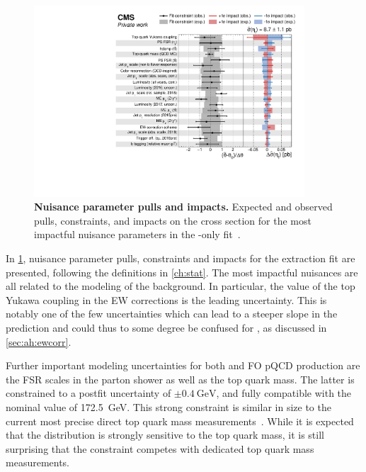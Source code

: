 \begin{figure}[th]
    \centering
    \includegraphics[width=0.9\textwidth]{figures/ah/etatfit/impacts_nonps.pdf}
    \caption{
        \textbf{Nuisance parameter pulls and impacts.} Expected and observed pulls, constraints, and impacts on the \etat cross section for the most impactful nuisance parameters in the \etat-only fit~\cite{CMS:TOP-24-007}.
    }
    \label{fig:ah:impacts_etat}
\end{figure}

In \cref{fig:ah:impacts_etat}, nuisance parameter pulls, constraints and impacts for the \etat extraction fit are presented, following the definitions in \cref{ch:stat}. The most impactful nuisances are all related to the modeling of the \ttbar background. In particular, %
the value of the top Yukawa coupling \yt in the EW corrections is the leading uncertainty. This is notably one of the few uncertainties which can lead to a steeper \chel slope in the \ttbar prediction and could thus to some degree be confused for \etat, as discussed in \cref{sec:ah:ewcorr}.

Further important modeling uncertainties for both \etat and FO pQCD \ttbar production are the FSR scales in the parton shower as well as the top quark mass. 
The latter is constrained to a postfit uncertainty of $\pm \SI{0.4}{\GeV}$, and fully compatible with the nominal value of \SI{172.5}{\GeV}. This strong constraint is similar in size to the current most precise direct top quark mass measurements~\cite{CMS:TOP-20-008,ATLASCMS:2024dxp}. While it is expected that the \mtt distribution is strongly sensitive to the top quark mass, it is still surprising that the constraint competes with dedicated top quark mass measurements.

